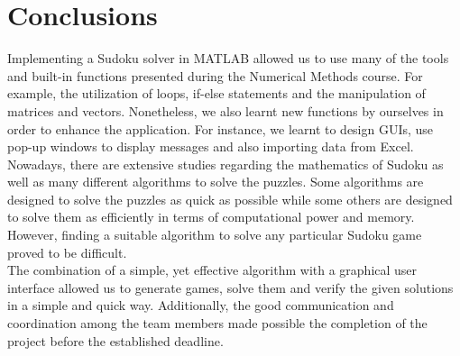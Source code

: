 \documentclass[12pt,a4paper]{article} %
\begin{document}
\section{Conclusions}
Implementing a Sudoku solver in MATLAB allowed us to use many of the tools and built-in functions presented during the Numerical Methods course. For example, the utilization of loops, if-else statements and the manipulation of matrices and vectors. Nonetheless, we also learnt new functions by ourselves in order to enhance the application. For instance, we learnt to design GUIs, use pop-up windows to display messages and also importing data from Excel.
\newline
\\Nowadays, there are extensive studies regarding the mathematics of Sudoku as well as many different algorithms to solve the puzzles. Some algorithms are designed to solve the puzzles as quick as possible while some others are designed to solve them as efficiently in terms of computational power and memory. However, finding a suitable algorithm to solve any particular Sudoku game proved to be difficult.
\newline
\\The combination of a simple, yet effective algorithm with a graphical user interface allowed us to generate games, solve them and verify the given solutions in a simple and quick way. Additionally, the good communication and coordination among the team members made possible the completion of the project before the established deadline.

{}

\end{document}
